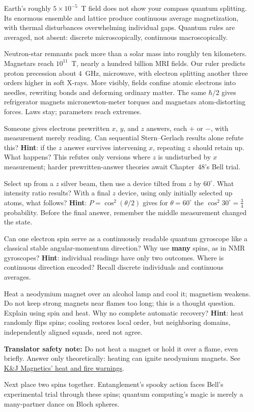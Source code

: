 Earth's roughly $5\times10^{-5}$~T field does not show your compass quantum splitting. Its enormous ensemble and lattice produce continuous average magnetization, with thermal disturbances overwhelming individual gaps. Quantum rules are averaged, not absent: discrete microscopically, continuous macroscopically.


\begin{thought}
Neutron-star remnants pack more than a solar mass into roughly ten kilometers. Magnetars reach $10^{11}$~T, nearly a hundred billion MRI fields. Our ruler predicts proton precession about $4$~GHz, microwave, with electron splitting another three orders higher in soft X-rays. More visibly, fields confine atomic electrons into needles, rewriting bonds and deforming ordinary matter. The same $\hbar/2$ gives refrigerator magnets micronewton-meter torques and magnetars atom-distorting forces. Laws stay; parameters reach extremes.
\end{thought}

\begin{puzzles}
\item Someone gives electrons prewritten $x$, $y$, and $z$ answers, each $+$ or $-$, with measurement merely reading. Can sequential Stern--Gerlach results alone refute this? \textbf{Hint}: if the $z$ answer survives intervening $x$, repeating $z$ should retain up. What happens? This refutes only versions where $z$ is undisturbed by $x$ measurement; harder prewritten-answer theories await Chapter~48's Bell trial.
\item Select up from a $z$ silver beam, then use a device tilted from $z$ by $60^\circ$. What intensity ratio results? With a final $z$ device, using only initially selected up atoms, what follows? \textbf{Hint}: $P=\cos^2(\theta/2)$ gives for $\theta=60^\circ$ the $\cos^2 30^\circ=\tfrac34$ probability. Before the final answer, remember the middle measurement changed the state.
\item Can one electron spin serve as a continuously readable quantum gyroscope like a classical stable angular-momentum direction? Why use \textbf{many} spins, as in NMR gyroscopes? \textbf{Hint}: individual readings have only two outcomes. Where is continuous direction encoded? Recall discrete individuals and continuous averages.
\item Heat a neodymium magnet over an alcohol lamp and cool it; magnetism weakens. Do not keep strong magnets near flames too long; this is a thought question. Explain using spin and heat. Why no complete automatic recovery? \textbf{Hint}: heat randomly flips spins; cooling restores local order, but neighboring domains, independently aligned squads, need not agree.

\textbf{Translator safety note:} Do not heat a magnet or hold it over a flame, even briefly. Answer only theoretically: heating can ignite neodymium magnets. See \href{https://www.kjmagnetics.com/faq.asp}{K\&J Magnetics' heat and fire warnings}.
\end{puzzles}

Next place two spins together. Entanglement's spooky action faces Bell's experimental trial through these spins; quantum computing's magic is merely a many-partner dance on Bloch spheres.
